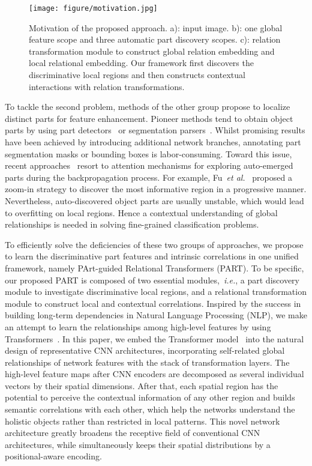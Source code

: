 \documentclass[journal]{IEEEtran}
\def\ie{{\em i.e.}}
\def\etal{{\em et al.}}
\begin{document}
\begin{figure}[!t]
	\centering
	\texttt{[image: figure/motivation.jpg]}
	\caption{Motivation of the proposed approach. a): input image. b): one global feature scope and three automatic part discovery scopes. c): relation transformation module to construct global relation embedding and local relational embedding. Our framework first discovers the discriminative local regions and then constructs contextual interactions with relation transformations.
	}
	\label{fig:motivation}
\end{figure}


To tackle the second problem, methods of the other group propose to localize distinct parts for feature enhancement. Pioneer methods tend to obtain object parts by using part detectors~\cite{huang2016part,ge2019weakly} or segmentation parsers~\cite{kalayeh2018human,huang2020interpretable}. Whilst promising results have been achieved by introducing additional network branches, annotating part segmentation masks or bounding boxes is labor-consuming. Toward this issue, recent approaches~\cite{fu2017look,recasens2018learning,yang2018learning} resort to attention mechanisms for exploring auto-emerged parts during the backpropagation process. For example, Fu~\etal~\cite{fu2017look} proposed a zoom-in strategy to discover the most informative region in a progressive manner.
Nevertheless, auto-discovered object parts are usually unstable, which would lead to overfitting on local regions. Hence a contextual understanding of global relationships is needed in solving fine-grained classification problems.

To efficiently solve the deficiencies of these two groups of approaches, we propose to learn the discriminative part features and intrinsic correlations in one unified framework, namely PArt-guided Relational Transformers (PART). To be specific, our proposed PART is composed of two essential modules,~\ie, a part discovery module to investigate discriminative local regions, and a relational transformation module to construct local and contextual correlations. Inspired by the success in building long-term dependencies in Natural Language Processing (NLP), we make an attempt to learn the relationships among high-level features by using Transformers~\cite{vaswani2017attention}. In this paper, we embed the Transformer model~\cite{vaswani2017attention} into the natural design of representative CNN architectures, incorporating self-related global relationships of network features with the stack of transformation layers. The high-level feature maps after CNN encoders are decomposed as several individual vectors by their spatial dimensions. After that, each spatial region has the potential to perceive the contextual information of any other region and builds semantic correlations with each other, which help the networks understand the holistic objects rather than restricted in local patterns. This novel network architecture greatly broadens the receptive field of conventional CNN architectures, while simultaneously keeps their spatial distributions by a positional-aware encoding.
\end{document}
